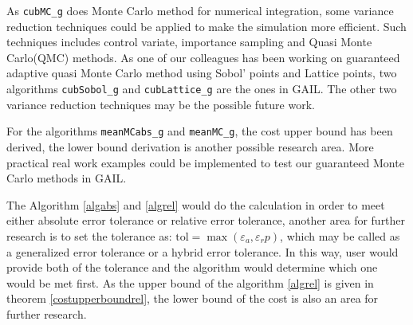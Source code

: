 \documentclass{iitthesis}
\theoremstyle{definition}
\begin{document}
As {\tt cubMC\_g} does Monte Carlo method for numerical integration, some variance reduction techniques could be applied to make the simulation more efficient. Such techniques includes control variate, importance sampling and Quasi Monte Carlo(QMC) methods. As one of our colleagues has been working on guaranteed adaptive quasi Monte Carlo method using Sobol' points \cite{Sobol67} and Lattice points, two algorithms {\tt cubSobol\_g} and {\tt cubLattice\_g} are the ones in GAIL. The other two variance reduction techniques may be the possible future work.

For the algorithms {\tt meanMCabs\_g} and {\tt meanMC\_g}, the cost upper bound has been derived, the lower bound derivation is another possible research area. More practical real work examples could be implemented to test our guaranteed Monte Carlo methods in GAIL.

The Algorithm \ref{algabs} and \ref{algrel} would do the calculation in order to meet either absolute error tolerance or relative error tolerance, another area for further research is to set the tolerance as: $\text{tol} = \max(\varepsilon_a, \varepsilon_r p)$, which may be called as a generalized error tolerance or a hybrid error tolerance. In this way, user would provide both of the tolerance and the algorithm would determine which one would be met first. As the upper bound of the algorithm \ref{algrel} is given in theorem \ref{costupperboundrel}, the lower bound of the cost is also an area for further research. 

%
%
%
%
%
%




%
%
%
\end{document}
